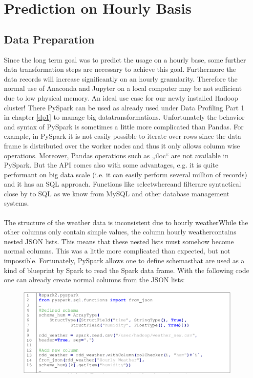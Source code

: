 
\section{Prediction on Hourly Basis}

\subsection{Data Preparation}
Since the long term goal was to predict the usage on a hourly base, some further data
transformation steps are necessary to achieve this goal. Furthermore the data records will
increase significantly on an hourly granularity. Therefore the normal use of Anaconda and Jupyter
on a local computer may be not sufficient due to low physical memory. An ideal use case for our
newly installed Hadoop cluster! There PySpark can be used as already used under Data Profiling
Part 1 in chapter \ref{dp1} to manage \glqq big data\grqq transformations. Unfortunately the behavior and syntax of PySpark
is sometimes a little more complicated than Pandas. For example, in PySpark it is not easily
possible to iterate over rows since the data frame is distributed over the worker nodes and thus it
only allows column wise operations. Moreover, Pandas operations such as „iloc“ are not available
in PySpark. But the API comes also with some advantages, e.g. it is quite performant on big data
scale (i.e. it can easily perform several million of records) and it has an SQL approach.
Functions like \glqq select\grqq \glqq where\grqq and \glqq filter\grqq are syntactical close by to SQL as we know from MySQL
and other database management systems.\\\\
The structure of the weather data is inconsistent due to \glqq hourly weather\grqq  While the other columns
only contain simple values, the column \glqq hourly weather\grqq contains nested JSON lists. This means
that these nested lists must somehow become normal columns. This was a little more complicated
than expected, but not impossible. Fortunately, PySpark allows one to define \glqq schemas\grqq that are
used as a kind of blueprint by Spark to read the Spark data frame. With the following code one
can already create normal columns from the JSON lists:
\begin{figure}[H]
\hspace{-1.6cm}
\includegraphics[width=1.2\textwidth]{img/listing5}\label{fig:listing5}
\label{fig:listing5}
\end{figure}
